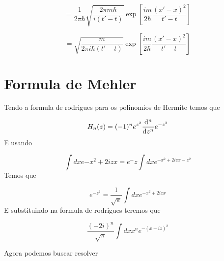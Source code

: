 \documentclass{book}
\begin{document}
 
 \begin{equation}
 	=\frac{1}{2\pi \hbar} \sqrt{\frac{2\pi m \hbar}{i(t'-t)}}\exp[\frac{im}{2\hbar} \frac{(x'-x)^2}{t'-t}]
 \end{equation}
 
 \begin{equation}
 =\sqrt{\frac{m}{2\pi i\hbar (t'-t)}}\exp[\frac{im}{2\hbar} \frac{(x'-x)^2}{t'-t}]
 \end{equation}
 
 
 
 \section{Formula de Mehler}
 
 Tendo a formula de rodrigues para os polinomios de Hermite temos que
 
 \begin{equation}
 	H_n(z)=(-1)^n e^{z^2} \dv[n]{z}e^{-z^2}
 \end{equation}
 E usando 
 
 \begin{equation}
 	\int dx e{-x^2+2izx}=e^-z \int dx e^{-x^2+2izx-z^2}
 \end{equation}
 Temos que
 
 \begin{equation}
 	e^{-z^2}= \frac{1}{\sqrt{\pi}}\int dx e^{-x^2+2izx}
 \end{equation}
 E substituindo na formula de rodrigues teremos que
 
 
 \begin{equation}
 	\frac{(-2i)^n}{\sqrt{\pi}} \int dx  x^n e^{-(x-iz)^2}
 \end{equation}
 
 Agora podemos buscar resolver
 
\end{document}
